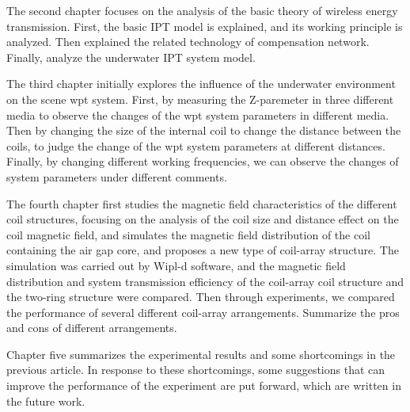 The second chapter focuses on the analysis of the basic theory of wireless energy transmission. First, the basic IPT model is explained, and its working principle is analyzed. Then explained the related technology of compensation network. Finally, analyze the underwater IPT system model.

The third chapter initially explores the influence of the underwater environment on the scene wpt system. First, by measuring the Z-paremeter in three different media to observe the changes of the wpt system parameters in different media. Then by changing the size of the internal coil to change the distance between the coils, to judge the change of the wpt system parameters at different distances. Finally, by changing different working frequencies, we can observe the changes of system parameters under different comments.

The fourth chapter first studies the magnetic field characteristics of the different coil structures, focusing on the analysis of the coil size and distance effect on the coil magnetic field, and simulates the magnetic field distribution of the coil containing the air gap core, and proposes a new type of coil-array structure. The simulation was carried out by Wipl-d software, and the magnetic field distribution and system transmission efficiency of the coil-array coil structure and the two-ring structure were compared. Then through experiments, we compared the performance of several different coil-array arrangements. Summarize the pros and cons of different arrangements.

Chapter five summarizes the experimental results and some shortcomings in the previous article. In response to these shortcomings, some suggestions that can improve the performance of the experiment are put forward, which are written in the future work.